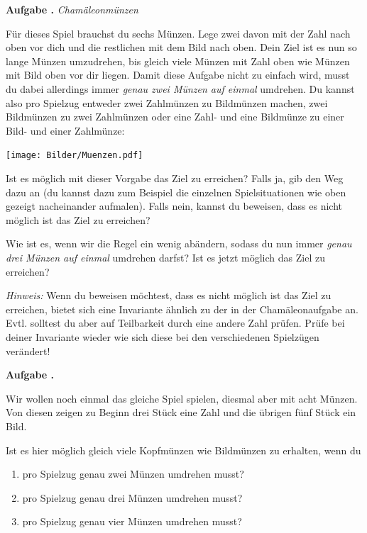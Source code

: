\documentclass[a4paper,ngerman,12pt]{scrartcl}
\theoremstyle{definition}
\theoremstyle{plain}
\theoremstyle{remark}
\newlength{\aufgabenskip}
\newcounter{aufgabennummer}
\newenvironment{aufgabe}[1]{
	\addtocounter{aufgabennummer}{1}
	\textbf{Aufgabe \theaufgabennummer.} \emph{#1} \par
}{\vspace{\aufgabenskip}}
\begin{document}
\begin{aufgabe}{Chamäleonmünzen}
	Für dieses Spiel brauchst du sechs Münzen. Lege zwei davon mit der Zahl nach oben vor dich und die restlichen mit dem Bild nach oben. Dein Ziel ist es nun so lange Münzen umzudrehen, bis gleich viele Münzen mit Zahl oben wie Münzen mit Bild oben vor dir liegen. Damit diese Aufgabe nicht zu einfach wird, musst du dabei allerdings immer \emph{genau zwei Münzen auf einmal } umdrehen. Du kannst also pro Spielzug entweder zwei Zahlmünzen zu Bildmünzen machen, zwei Bildmünzen zu zwei Zahlmünzen oder eine Zahl- und eine Bildmünze zu einer Bild- und einer Zahlmünze:
	
	\begin{center}
		\texttt{[image: Bilder/Muenzen.pdf]}
	\end{center}
	
	Ist es möglich mit dieser Vorgabe das Ziel zu erreichen? Falls ja, gib den Weg dazu an (du kannst dazu zum Beispiel die einzelnen Spielsituationen wie oben gezeigt nacheinander aufmalen). Falls nein, kannst du beweisen, dass es nicht möglich ist das Ziel zu erreichen? 
	
	Wie ist es, wenn wir die Regel ein wenig abändern, sodass du nun immer \emph{genau drei Münzen auf einmal} umdrehen darfst? Ist es jetzt möglich das Ziel zu erreichen?
	
	\emph{Hinweis:} Wenn du beweisen möchtest, dass es nicht möglich ist das Ziel zu erreichen, bietet sich eine Invariante ähnlich zu der in der Chamäleonaufgabe an. Evtl. solltest du aber auf Teilbarkeit durch eine andere Zahl prüfen. Prüfe bei deiner Invariante wieder wie sich diese bei den verschiedenen Spielzügen verändert!
\end{aufgabe}

\begin{aufgabe}{}
	Wir wollen noch einmal das gleiche Spiel spielen, diesmal aber mit acht Münzen. Von diesen zeigen zu Beginn drei Stück eine Zahl und die übrigen fünf Stück ein Bild.
	
	Ist es hier möglich gleich viele Kopfmünzen wie Bildmünzen zu erhalten, wenn du
	\begin{enumerate}
		\item pro Spielzug genau zwei Münzen umdrehen musst?
		\item pro Spielzug genau drei Münzen umdrehen musst?
		\item pro Spielzug genau vier Münzen umdrehen musst?
	\end{enumerate}
\end{aufgabe}
\end{document}
